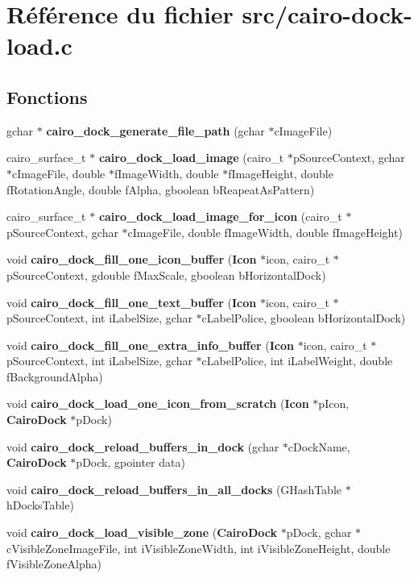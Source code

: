 \section{R\'{e}f\'{e}rence du fichier src/cairo-dock-load.c}
\label{cairo-dock-load_8c}
\subsection*{Fonctions}
\begin{CompactItemize}
\item 
gchar $\ast$ {\bf cairo\_\-dock\_\-generate\_\-file\_\-path} (gchar $\ast$c\-Image\-File)
\item 
cairo\_\-surface\_\-t $\ast$ {\bf cairo\_\-dock\_\-load\_\-image} (cairo\_\-t $\ast$p\-Source\-Context, gchar $\ast$c\-Image\-File, double $\ast$f\-Image\-Width, double $\ast$f\-Image\-Height, double f\-Rotation\-Angle, double f\-Alpha, gboolean b\-Reapeat\-As\-Pattern)
\item 
cairo\_\-surface\_\-t $\ast$ {\bf cairo\_\-dock\_\-load\_\-image\_\-for\_\-icon} (cairo\_\-t $\ast$p\-Source\-Context, gchar $\ast$c\-Image\-File, double f\-Image\-Width, double f\-Image\-Height)
\item 
void {\bf cairo\_\-dock\_\-fill\_\-one\_\-icon\_\-buffer} ({\bf Icon} $\ast$icon, cairo\_\-t $\ast$p\-Source\-Context, gdouble f\-Max\-Scale, gboolean b\-Horizontal\-Dock)
\item 
void {\bf cairo\_\-dock\_\-fill\_\-one\_\-text\_\-buffer} ({\bf Icon} $\ast$icon, cairo\_\-t $\ast$p\-Source\-Context, int i\-Label\-Size, gchar $\ast$c\-Label\-Police, gboolean b\-Horizontal\-Dock)
\item 
void {\bf cairo\_\-dock\_\-fill\_\-one\_\-extra\_\-info\_\-buffer} ({\bf Icon} $\ast$icon, cairo\_\-t $\ast$p\-Source\-Context, int i\-Label\-Size, gchar $\ast$c\-Label\-Police, int i\-Label\-Weight, double f\-Background\-Alpha)
\item 
void {\bf cairo\_\-dock\_\-load\_\-one\_\-icon\_\-from\_\-scratch} ({\bf Icon} $\ast$p\-Icon, {\bf Cairo\-Dock} $\ast$p\-Dock)
\item 
void {\bf cairo\_\-dock\_\-reload\_\-buffers\_\-in\_\-dock} (gchar $\ast$c\-Dock\-Name, {\bf Cairo\-Dock} $\ast$p\-Dock, gpointer data)
\item 
void {\bf cairo\_\-dock\_\-reload\_\-buffers\_\-in\_\-all\_\-docks} (GHash\-Table $\ast$h\-Docks\-Table)
\item 
void {\bf cairo\_\-dock\_\-load\_\-visible\_\-zone} ({\bf Cairo\-Dock} $\ast$p\-Dock, gchar $\ast$c\-Visible\-Zone\-Image\-File, int i\-Visible\-Zone\-Width, int i\-Visible\-Zone\-Height, double f\-Visible\-Zone\-Alpha)

\end{CompactItemize}
